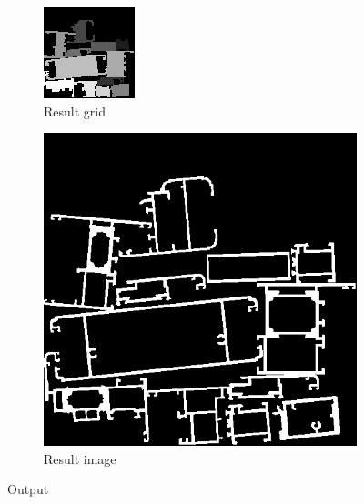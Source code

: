 \documentclass{article}
\begin{document}
	\begin{figure}[h]
		\centering
		\begin{subfigure}{0.5\textwidth}
			\centering
			\includegraphics[width=0.6\linewidth]{result_grid}
			\caption{Result grid}
			\label{fig:resimg}
		\end{subfigure}%
		\begin{subfigure}{0.5\textwidth}
			\centering
			\includegraphics[width=0.6\linewidth]{result_img}
			\caption{Result image}
			\label{fig:resgrid}
		\end{subfigure}
		\caption{Output}
		\label{fig:res}
	\end{figure}
	
\end{document}
